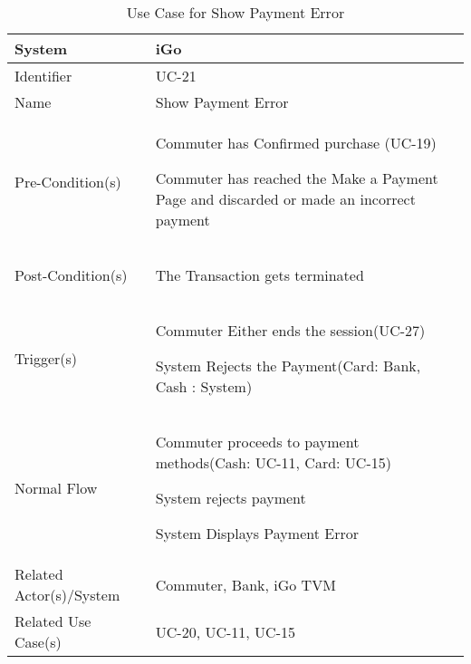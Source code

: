 \begin{table}[ht]
    \centering
    \begin{tabular}{|l|p{10cm}|}
        \hline
        System             & iGo\\
        \hline
        Identifier         & UC-21 \\
        \hline
        Name               &  Show Payment Error \\
        Pre-Condition(s)   & 
        \begin{enumerate*}[itemjoin=\newline]
            \item Commuter has Confirmed purchase (UC-19)
            \item Commuter has reached the Make a Payment Page and discarded or made an incorrect payment 
        \end{enumerate*} \\
        \hline
        Post-Condition(s)  & 
        \begin{enumerate*}[itemjoin=\newline]
            \item The Transaction gets terminated
        \end{enumerate*} \\
        \hline
        Trigger(s)            & 
         \begin{enumerate*}[itemjoin=\newline]
            \item Commuter Either ends the session(UC-27)
            \item System Rejects the Payment(Card: Bank, Cash : System)
        \end{enumerate*} \\
        \hline
        Normal Flow        & 
        \begin{enumerate*}[itemjoin=\newline]
            \item Commuter proceeds to payment methods(Cash: UC-11, Card: UC-15)
            \item System rejects payment 
            \item System Displays Payment Error
        \end{enumerate*} \\
        \hline
         Related Actor(s)/System   &  Commuter, Bank, iGo TVM \\
        \hline
        Related Use Case(s)& UC-20, UC-11, UC-15\\
        \hline
    \end{tabular}
    \caption{Use Case for Show Payment Error}
    \label{tab:UC_PaymentError}
\end{table}

